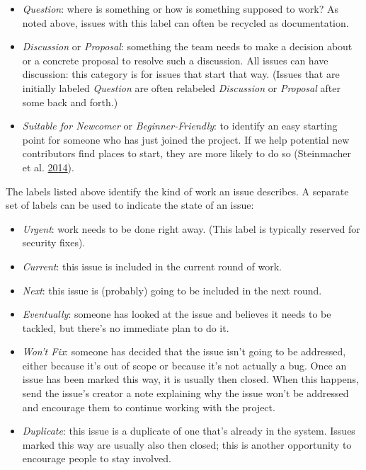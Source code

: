 \documentclass[
]{krantz}
\begin{document}
\begin{itemize}
\item
  \emph{Question}: where is something
  or how is something supposed to work?
  As noted above,
  issues with this label can often be recycled as documentation.
\item
  \emph{Discussion} or \emph{Proposal}: something the team needs to make a decision about
  or a concrete proposal to resolve such a discussion.
  All issues can have discussion:
  this category is for issues that start that way.
  (Issues that are initially labeled \emph{Question}
  are often relabeled \emph{Discussion} or \emph{Proposal}
  after some back and forth.)
\item
  \emph{Suitable for Newcomer} or \emph{Beginner-Friendly}:
  to identify an easy starting point for someone who has just joined the project.
  If we help potential new contributors find places to start,
  they are more likely to do so (Steinmacher et al. \protect\hyperlink{ref-Stei2014}{2014}).
\end{itemize}

The labels listed above identify the kind of work an issue describes.
A separate set of labels can be used to indicate the state of an issue:

\begin{itemize}
\item
  \emph{Urgent}: work needs to be done right away.
  (This label is typically reserved for security fixes).
\item
  \emph{Current}: this issue is included in the current round of work.
\item
  \emph{Next}: this issue is (probably) going to be included in the next round.
\item
  \emph{Eventually}: someone has looked at the issue and believes it needs to be tackled,
  but there's no immediate plan to do it.
\item
  \emph{Won't Fix}: someone has decided that the issue isn't going to be addressed,
  either because it's out of scope or because it's not actually a bug.
  Once an issue has been marked this way,
  it is usually then closed.
  When this happens,
  send the issue's creator a note explaining why the issue won't be addressed
  and encourage them to continue working with the project.
\item
  \emph{Duplicate}: this issue is a duplicate of one that's already in the system.
  Issues marked this way are usually also then closed;
  this is another opportunity to encourage people to stay involved.
\end{itemize}
\end{document}
